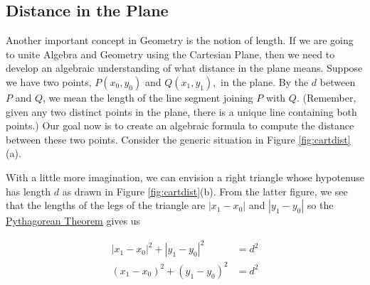\smallskip


\subsection{Distance in the Plane}

Another important concept in Geometry is the notion of length.  If we are going to unite Algebra and Geometry using the Cartesian Plane, then we need to develop an algebraic understanding of what distance in the plane means.  Suppose we have two points, $P\left(x_{0}, y_{0}\right)$ and $Q\left(x_{1}, y_{1}\right),$ in the plane. By the   $d$  between $P$ and $Q$, we mean the length of the line segment joining $P$ with $Q$.  (Remember, given any two distinct points in the plane, there is a unique line containing both points.)  Our goal now is to create an algebraic formula to compute the distance between these two points. Consider the generic situation in Figure \ref{fig:cartdist}(a).

\medskip


\medskip

With a little more imagination, we can envision a right triangle whose hypotenuse has length $d$ as drawn in Figure \ref{fig:cartdist}(b).  From the latter figure, we see that the lengths of the legs of the triangle are $\left\lvert x_{1} - x_{0}\right\rvert$ and $\left\lvert y_{1} - y_{0}\right\rvert$ so the \href{http://en.wikipedia.org/wiki/Pythagorean_Theorem}{\underline{Pythagorean Theorem}} gives us
 
  \begin{align*}
   \left\lvert x_{1} - x_{0}\right\rvert^2 + \left\lvert y_{1} - y_{0}\right\rvert^2 &= d^2\\
   \left(x_{1} - x_{0}\right)^2 + \left(y_{1} - y_{0}\right)^2 &= d^2
  \end{align*}
 

